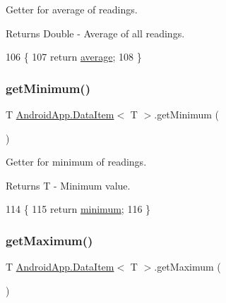 Getter for average of readings. 

\begin{DoxyReturn}{Returns}
Double -\/ Average of all readings. 
\end{DoxyReturn}

\begin{DoxyCode}
106                                \{
107         \textcolor{keywordflow}{return} \hyperlink{class_android_app_1_1_data_item_a231634a35289bb35c46f7fa3111cd472}{average};
108     \}
\end{DoxyCode}
\mbox{\label{class_android_app_1_1_data_item_a1acf18ed04f82adb18ff73f4ef70b863}} 
\subsubsection{\texorpdfstring{get\+Minimum()}{getMinimum()}}
{\footnotesize\ttfamily T \hyperlink{class_android_app_1_1_data_item}{Android\+App.\+Data\+Item}$<$ T $>$.get\+Minimum (\begin{DoxyParamCaption}{ }\end{DoxyParamCaption})\hspace{0.3cm}{\ttfamily [inline]}}



Getter for minimum of readings. 

\begin{DoxyReturn}{Returns}
T -\/ Minimum value. 
\end{DoxyReturn}

\begin{DoxyCode}
114                           \{
115         \textcolor{keywordflow}{return} \hyperlink{class_android_app_1_1_data_item_a23e9e2f0dbcfe5e163cd57888ed3dbd7}{minimum};
116     \}
\end{DoxyCode}
\mbox{\label{class_android_app_1_1_data_item_abc05cb2c7e1c30a018191cb140afc948}} 
\subsubsection{\texorpdfstring{get\+Maximum()}{getMaximum()}}
{\footnotesize\ttfamily T \hyperlink{class_android_app_1_1_data_item}{Android\+App.\+Data\+Item}$<$ T $>$.get\+Maximum (\begin{DoxyParamCaption}{ }\end{DoxyParamCaption})\hspace{0.3cm}{\ttfamily [inline]}}



